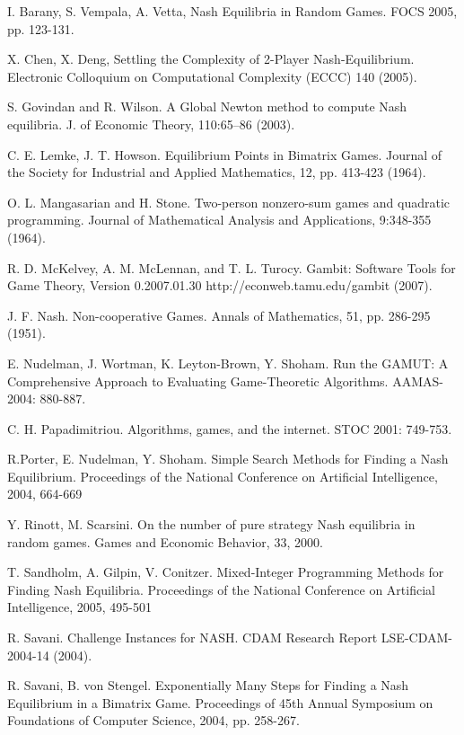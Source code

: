 \documentclass[11pt]{article}
\begin{document}
{\small
\begin{thebibliography}{99}

 I. Barany, S. Vempala, A. Vetta, Nash Equilibria
in Random Games. FOCS 2005, pp. 123-131.

 X. Chen, X. Deng, Settling the Complexity of 2-Player
Nash-Equilibrium. Electronic Colloquium on Computational Complexity
(ECCC) 140 (2005).

 S. Govindan and R. Wilson. A Global Newton method to compute Nash
equilibria. J. of Economic Theory, 110:65--86 (2003).

C. E. Lemke, J. T. Howson. Equilibrium Points in Bimatrix Games.
Journal of the Society for Industrial and Applied Mathematics, 12,
pp. 413-423 (1964).



 O. L. Mangasarian and H. Stone. Two-person nonzero-sum games and
quadratic programming. Journal of Mathematical Analysis and
Applications, 9:348-355 (1964).

R. D. McKelvey, A. M. McLennan, and T. L. Turocy.
Gambit: Software Tools for Game Theory, Version 0.2007.01.30
http://econweb.tamu.edu/gambit (2007).

J. F. Nash. Non-cooperative Games. Annals of Mathematics, 51, pp.
286-295 (1951).

E. Nudelman, J. Wortman, K. Leyton-Brown, Y. Shoham.
Run the GAMUT: A Comprehensive Approach to Evaluating Game-Theoretic Algorithms.
AAMAS-2004: 880-887.

C. H. Papadimitriou. Algorithms, games, and the internet.
STOC 2001: 749-753.

R.Porter, E. Nudelman, Y. Shoham. Simple Search Methods for Finding
a Nash Equilibrium. Proceedings of the National Conference on
Artificial Intelligence, 2004, 664-669

Y. Rinott, M. Scarsini.
On the number of pure strategy Nash equilibria in random games.
Games and Economic Behavior, 33, 2000.

T. Sandholm, A. Gilpin, V. Conitzer. Mixed-Integer Programming Methods
for Finding Nash Equilibria. Proceedings of the National Conference on
Artificial Intelligence, 2005, 495-501

R. Savani. Challenge Instances for NASH. CDAM Research
Report LSE-CDAM-2004-14 (2004).

R. Savani, B. von Stengel.
Exponentially Many Steps for Finding a Nash Equilibrium in a Bimatrix Game.
Proceedings of 45th Annual Symposium on Foundations of Computer
Science, 2004, pp. 258-267.


\end{thebibliography}}
\end{document}

